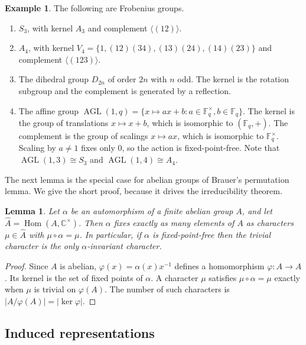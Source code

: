 \documentclass[12pt,letterpaper]{article}
\numberwithin{equation}{section}
\theoremstyle{plain}
\newtheorem{lemma}[theorem]{Lemma}
\theoremstyle{definition}
\newtheorem{example}[theorem]{Example}
\newcommand{\F}{\mathbb{F}}
\newcommand{\C}{\mathbb{C}}
\DeclareMathOperator{\AGL}{AGL}
\begin{document}
\begin{example}\label{ex:frob}
The following are Frobenius groups.
\begin{enumerate}[itemsep=1pt]
\item $S_3$, with kernel $A_3$ and complement $\langle(12)\rangle$.
\item $A_4$, with kernel $V_4=\{1,(12)(34),(13)(24),(14)(23)\}$ and
  complement $\langle(123)\rangle$.
\item The dihedral group $D_{2n}$ of order $2n$ with $n$ odd. The kernel is
  the rotation subgroup and the complement is generated by a reflection.
\item The affine group $\AGL(1,q)=\{x\mapsto ax+b : a\in\F_q^\times,
  b\in\F_q\}$. The kernel is the group of translations $x\mapsto x+b$, which
  is isomorphic to $(\F_q,+)$. The complement is the group of scalings
  $x\mapsto ax$, which is isomorphic to $\F_q^\times$. Scaling by $a\neq1$
  fixes only $0$, so the action is fixed-point-free. Note that
  $\AGL(1,3)\cong S_3$ and $\AGL(1,4)\cong A_4$.
\end{enumerate}
\end{example}

The next lemma is the special case for abelian groups of Brauer's
permutation lemma. We give the short proof, because it drives the
irreducibility theorem.

\begin{lemma}\label{lem:brauerperm}
Let $\alpha$ be an automorphism of a finite abelian group $A$, and let
$\widehat A=\operatorname{Hom}(A,\C^\times)$. Then $\alpha$ fixes exactly
as many elements of $A$ as characters $\mu\in\widehat A$ with
$\mu\circ\alpha=\mu$. In particular, if $\alpha$ is fixed-point-free then
the trivial character is the only $\alpha$-invariant character.
\end{lemma}

\begin{proof}
Since $A$ is abelian, $\varphi(x)=\alpha(x)x^{-1}$ defines a homomorphism
$\varphi\colon A\to A$. Its kernel is the set of fixed points of $\alpha$. A
character $\mu$ satisfies $\mu\circ\alpha=\mu$ exactly when $\mu$ is
trivial on $\varphi(A)$. The number of such characters is
$|A/\varphi(A)|=|\ker\varphi|$.
\end{proof}

\subsection{Induced representations}\label{sec:induction}
\end{document}
